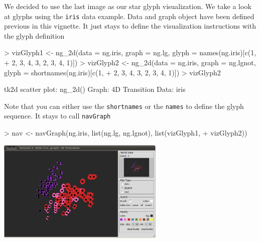 \documentclass[12pt,oneside,titlepage,letter]{article}
\newcommand{\modify}[1]{{\color{blue}#1}}
\begin{document}
\begin{center}
\end{center}

\modify{We decided to use the last image as our star glyph visualization}. We take a look at glyphs using the \texttt{iris} data example. Data and graph object have been defined previous in this vignette. It just stays to define the visualization instructions with the glyph definition

\begin{Schunk}
\begin{Sinput}
> vizGlyph1 <- ng_2d(data = ng.iris, graph = ng.lg, glyph = names(ng.iris)[c(1, 
+     2, 3, 4, 3, 2, 3, 4, 1)])
> vizGlyph2 <- ng_2d(data = ng.iris, graph = ng.lgnot, glyph = shortnames(ng.iris)[c(1, 
+     2, 3, 4, 3, 2, 3, 4, 1)])
> vizGlyph2
\end{Sinput}
\begin{Soutput}
tk2d scatter plot: ng_2d()
Graph: 4D Transition 
Data: iris 
\end{Soutput}
\end{Schunk}
Note that you can either use the \texttt{shortnames} or the \texttt{names} to define the glyph sequence. It stays to call \texttt{navGraph}
\begin{Schunk}
\begin{Sinput}
> nav <- navGraph(ng.iris, list(ng.lg, ng.lgnot), list(vizGlyph1, 
+     vizGlyph2))
\end{Sinput}
\end{Schunk}

\begin{center}
  \includegraphics[width = 0.6\textwidth]{img/tk2dGlyphs.png}
\end{center}
\end{document}
